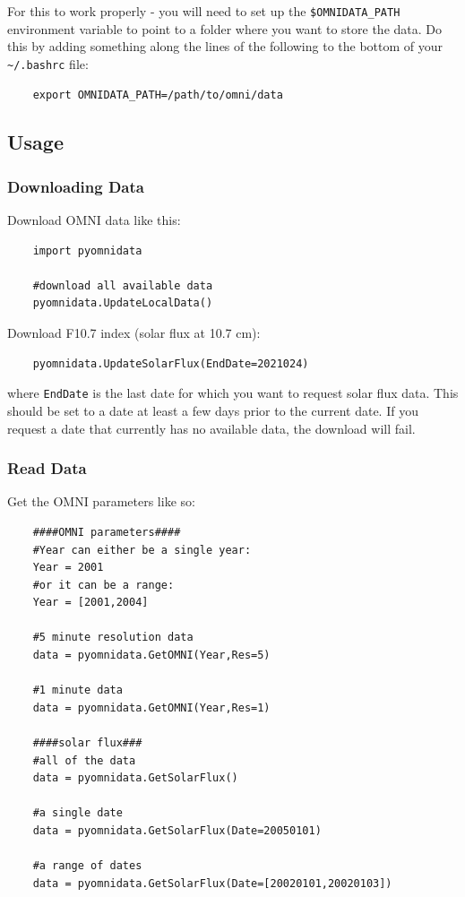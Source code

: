 	For this to work properly - you will need to set up the \texttt{\$OMNIDATA\_PATH} environment variable to point to a folder where you want to store the data. Do this by adding something along the lines of the following to the bottom of your \texttt{\~{}/.bashrc} file:
	
	\begin{verbatim}
	export OMNIDATA_PATH=/path/to/omni/data
	\end{verbatim}
	
	\subsection{Usage}
	
	\subsubsection{Downloading Data}
	
	Download OMNI data like this:
	
	\begin{verbatim}
	import pyomnidata
	
	#download all available data
	pyomnidata.UpdateLocalData()
	\end{verbatim}
	
	Download F10.7 index (solar flux at 10.7 cm):
	
	\begin{verbatim}
	pyomnidata.UpdateSolarFlux(EndDate=2021024)
	\end{verbatim}
	
	where \texttt{EndDate} is the last date for which you want to request solar flux data. This should be set to a date at least a few days prior to the current date. If you request a date that currently has no available data, the download will fail.
	
	\subsubsection{Read Data}
	
	Get the OMNI parameters like so:
	
	\begin{verbatim}
	####OMNI parameters####
	#Year can either be a single year:
	Year = 2001
	#or it can be a range:
	Year = [2001,2004]
	
	#5 minute resolution data
	data = pyomnidata.GetOMNI(Year,Res=5)
	
	#1 minute data
	data = pyomnidata.GetOMNI(Year,Res=1)
	
	####solar flux###
	#all of the data
	data = pyomnidata.GetSolarFlux()
	
	#a single date
	data = pyomnidata.GetSolarFlux(Date=20050101)
	
	#a range of dates
	data = pyomnidata.GetSolarFlux(Date=[20020101,20020103])
	\end{verbatim}
	
